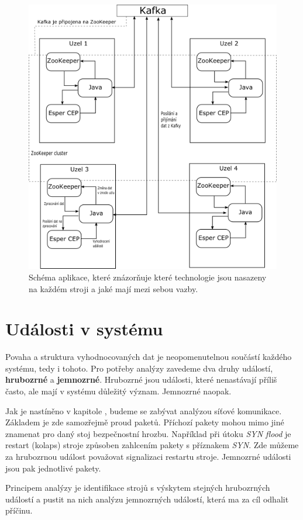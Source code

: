 \documentclass[
  digital, %
  table,   %
  nolof,     %
  nolot,     %
  oneside, %
  nocover,
  monochrome,
  12pt
]{fithesis3}
\begin{document}
\begin{figure}[H]
	\centering
    \includegraphics[width=.7\linewidth, height=.57\textheight]{images/app-architecture.png}
    \caption{Schéma aplikace, které znázorňuje které technologie jsou nasazeny na každém stroji a jaké mají mezi sebou vazby.}
    \label{fig:app-architecture}
\end{figure}

\section{Události v systému}
\label{sec:udalosti-v-systemu}
Povaha a struktura vyhodnocovaných dat je neopomenutelnou součástí každého systému, tedy i tohoto. Pro potřeby analýzy zavedeme dva druhy událostí, \textbf{hrubozrné} a \textbf{jemnozrné}. Hrubozrné jsou události, které nenastávají příliš často, ale mají v systému důležitý význam. Jemnozrné naopak.

Jak je nastíněno v kapitole \label{sec:analysis}, budeme se zabývat analýzou síťové komunikace. Základem je zde samozřejmě proud paketů. Příchozí pakety mohou mimo jiné znamenat pro daný stoj bezpečnostní hrozbu. Například při útoku \textit{SYN flood} je restart (kolaps) stroje způsoben zahlcením pakety s příznakem \textit{SYN}. Zde můžeme za hrubozrnou událost považovat signalizaci restartu stroje. Jemnozrné události jsou pak jednotlivé pakety.

Principem analýzy je identifikace strojů s výskytem stejných hrubozrných událostí a pustit na nich analýzu jemnozrných událostí, která ma za cíl odhalit příčinu.
 
\end{document}
